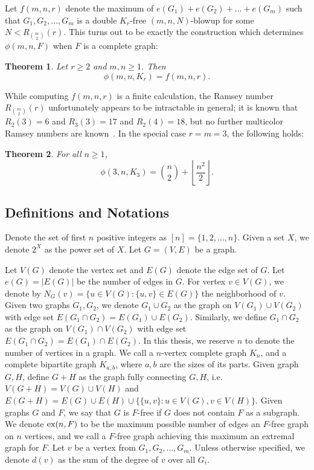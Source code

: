 \documentclass[12pt]{article}
\newtheorem{theorem}{Theorem}
\newcommand*{\ex}{\textnormal{ex}}
\begin{document}
Let $f(m, n, r)$ denote the maximum of $e(G_1) + e(G_2) + \dots + e(G_m)$ such that $G_1, G_2, \dots, G_m$ is a double $K_r$-free $(m, n, N)$-blowup for some $N < R_{\binom{m}{2}}(r)$. This turns out to be exactly the construction which determines $\phi(m, n, F)$ when $F$ is a complete graph: 

\begin{theorem}\label{thm:blowup}
Let $r \geq 2$ and $m,n \geq 1$. Then 
\[ 
  \phi(m, n, K_r) = f(m, n, r).
\]
\end{theorem}

While computing $f(m, n, r)$ is a finite calculation, the Ramsey number $R_{\binom{m}{2}}(r)$ unfortunately appears to be intractable in general; it is known that $R_2(3) = 6$ and $R_3(3) = 17$ and $R_2(4) = 18$, but no further multicolor Ramsey numbers are known~\cite{ConlonFerber2021,Lefmann1987}. In the special case $r = m = 3$, the following holds: 

\begin{theorem}\label{thm:triangles}
  For all $n \geq 1$,
  \[
    \phi(3, n, K_3) = \binom{n}{2} + \left\lfloor \frac{n^2}{2} \right\rfloor.
  \]
\end{theorem}

\subsection{Definitions and Notations}

Denote the set of first $n$ positive integers as $[n] = \{1, 2, \ldots, n\}$. Given a set $X$, we denote $2^X$ as the power set of $X$. Let $G = (V, E)$ be a graph. 

Let $V(G)$ denote the vertex set and $E(G)$ denote the edge set of $G$. Let $e(G) = |E(G)|$ be the number of edges in $G$. For vertex $v \in V(G)$, we denote by $N_G(v) = \{u \in V(G) : \{u, v\} \in E(G)\}$ the neighborhood of $v$. Given two graphs $G_1, G_2$, we denote $G_1 \cup G_2$ as the graph on $V(G_1) \cup V(G_2)$ with edge set $E(G_1 \cap G_2) = E(G_1) \cup E(G_2)$. Similarly, we define $G_1 \cap G_2$ as the graph on $V(G_1) \cap V(G_2)$ with edge set $E(G_1 \cap G_2) = E(G_1) \cap E(G_2)$. In this thesis, we reserve $n$ to denote the number of vertices in a graph. We call a $n$-vertex complete graph $K_n$, and a complete bipartite graph $K_{a, b}$, where $a, b$ are the sizes of its parts. Given graph $G, H$, define $G + H$ as the graph fully connecting $G, H$, i.e. $V(G + H) = V(G) \cup V(H)$ and $E(G + H) = E(G) \cup E(H) \cup \{\{u, v\} : u \in V(G), v \in V(H)\}$. Given graphs $G$ and $F$, we say that $G$ is $F$-free if $G$ does not contain $F$ as a subgraph. We denote $\ex(n, F)$ to be the maximum possible number of edges an $F$-free graph on $n$ vertices, and we call a $F$-free graph achieving this maximum an extremal graph for $F$. Let $v$ be a vertex from $G_1, G_2, \ldots, G_m$. Unless otherwise specified, we denote $d(v)$ as the sum of the degree of $v$ over all $G_i$.
\end{document}
